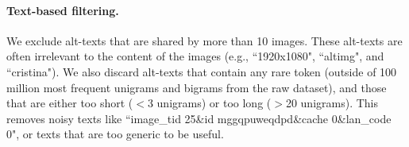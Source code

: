 \documentclass{article}
\begin{document}
\paragraph{Text-based filtering.} We exclude alt-texts that are shared by more than 10 images. These alt-texts are often irrelevant to the content of the images (e.g., ``1920x1080", ``alt\textunderscore img", and ``cristina"). We also discard alt-texts that contain any rare token (outside of 100 million most frequent unigrams and bigrams from the raw dataset), and those that are either too short ($<$3 unigrams) or too long ($>$20 unigrams). This removes noisy texts like ``image\_tid 25\&id mggqpuweqdpd\&cache 0\&lan\_code 0", or texts that are too generic to be useful.
\vspace{-2mm}





\end{document}
